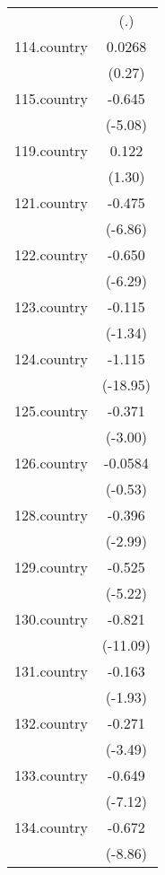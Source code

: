 {\begin{tabular}{l*{1}{c}}
            &         (.)         \\
[1em]
114.country &      0.0268         \\
            &      (0.27)         \\
[1em]
115.country &      -0.645\sym{***}\\
            &     (-5.08)         \\
[1em]
119.country &       0.122         \\
            &      (1.30)         \\
[1em]
121.country &      -0.475\sym{***}\\
            &     (-6.86)         \\
[1em]
122.country &      -0.650\sym{***}\\
            &     (-6.29)         \\
[1em]
123.country &      -0.115         \\
            &     (-1.34)         \\
[1em]
124.country &      -1.115\sym{***}\\
            &    (-18.95)         \\
[1em]
125.country &      -0.371\sym{**} \\
            &     (-3.00)         \\
[1em]
126.country &     -0.0584         \\
            &     (-0.53)         \\
[1em]
128.country &      -0.396\sym{**} \\
            &     (-2.99)         \\
[1em]
129.country &      -0.525\sym{***}\\
            &     (-5.22)         \\
[1em]
130.country &      -0.821\sym{***}\\
            &    (-11.09)         \\
[1em]
131.country &      -0.163         \\
            &     (-1.93)         \\
[1em]
132.country &      -0.271\sym{***}\\
            &     (-3.49)         \\
[1em]
133.country &      -0.649\sym{***}\\
            &     (-7.12)         \\
[1em]
134.country &      -0.672\sym{***}\\
            &     (-8.86)         \\

\end{tabular}}
